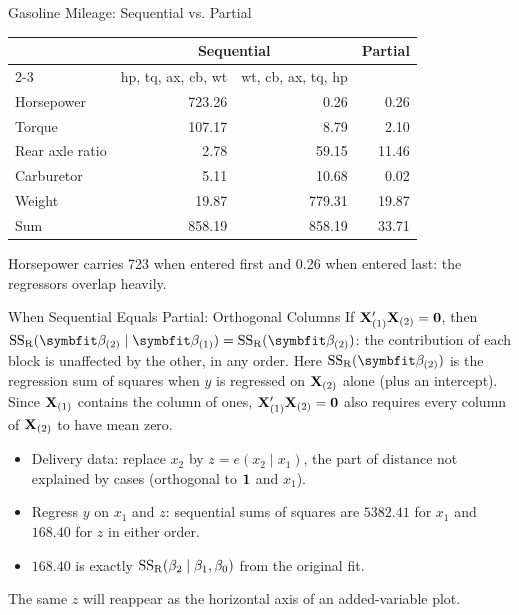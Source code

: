 \begin{frame}{Gasoline Mileage: Sequential vs. Partial}
    \begin{center}
        \small
        \begin{tabular}{lrrr}
            \toprule
            & \multicolumn{2}{c}{Sequential} & Partial \\
            \cmidrule(lr){2-3}
            & hp, tq, ax, cb, wt & wt, cb, ax, tq, hp & \\
            \midrule
            Horsepower & 723.26 & 0.26 & 0.26 \\
            Torque & 107.17 & 8.79 & 2.10 \\
            Rear axle ratio & 2.78 & 59.15 & 11.46 \\
            Carburetor & 5.11 & 10.68 & 0.02 \\
            Weight & 19.87 & 779.31 & 19.87 \\
            \midrule
            Sum & 858.19 & 858.19 & 33.71 \\
            \bottomrule
        \end{tabular}
    \end{center}
    Horsepower carries 723 when entered first and 0.26 when entered last: the regressors overlap heavily.
\end{frame}


\begin{frame}{When Sequential Equals Partial: Orthogonal Columns}
    If $\mathbf{X}_{(1)}'\mathbf{X}_{(2)}=\mathbf{0}$, then $\SSR(\bbeta_{(2)}\mid\bbeta_{(1)})=\SSR(\bbeta_{(2)})$: the contribution of each block is unaffected by the other, in any order. Here $\SSR(\bbeta_{(2)})$ is the regression sum of squares when $y$ is regressed on $\mathbf{X}_{(2)}$ alone (plus an intercept). Since $\mathbf{X}_{(1)}$ contains the column of ones, $\mathbf{X}_{(1)}'\mathbf{X}_{(2)}=\mathbf{0}$ also requires every column of $\mathbf{X}_{(2)}$ to have mean zero.
    \begin{itemize}
        \item Delivery data: replace $x_2$ by $z=e(x_2\mid x_1)$, the part of distance not explained by cases (orthogonal to $\mathbf{1}$ and $x_1$).
        \item Regress $y$ on $x_1$ and $z$: sequential sums of squares are $5382.41$ for $x_1$ and $168.40$ for $z$ in either order.
        \item $168.40$ is exactly $\mathrm{SS}_{\mathrm{R}}(\beta_2\mid\beta_1,\beta_0)$ from the original fit.
    \end{itemize}
    The same $z$ will reappear as the horizontal axis of an added-variable plot.
\end{frame}


